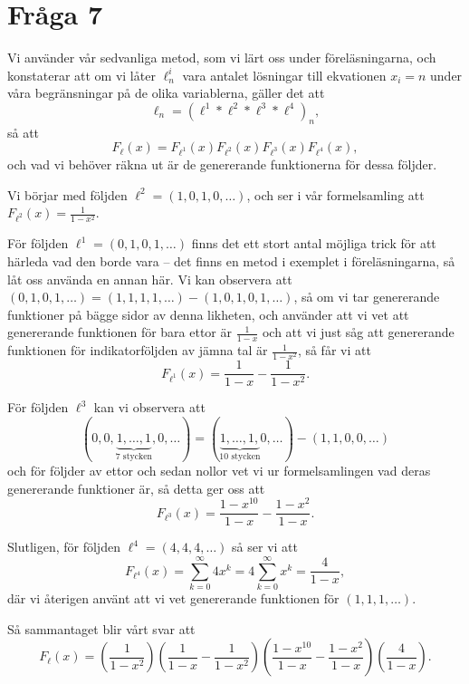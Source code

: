 \documentclass[nobib]{tufte-handout}
\begin{document}
\section{Fråga 7}

Vi använder vår sedvanliga metod, som vi lärt oss under föreläsningarna, och konstaterar att om vi låter $\ell^i_n$ vara antalet lösningar till ekvationen $x_i = n$ under våra begränsningar på de olika variablerna, gäller det att
$$\ell_n = (\ell^1 * \ell^2 * \ell^3 * \ell^4)_n,$$
så att
$$F_\ell(x) = F_{\ell^1}(x)F_{\ell^2}(x)F_{\ell^3}(x)F_{\ell^4}(x),$$
och vad vi behöver räkna ut är de genererande funktionerna för dessa följder.

Vi börjar med följden $\ell^2 = (1,0,1,0,\ldots)$, och ser i vår formelsamling att $F_{\ell^2}(x) = \frac{1}{1 - x^2}$.

För följden $\ell^1 = (0,1,0,1,\ldots)$ finns det ett stort antal möjliga trick för att härleda vad den borde vara -- det finns en metod i exemplet i föreläsningarna, så låt oss använda en annan här. Vi kan observera att $(0,1,0,1,\ldots) = (1,1,1,1,\ldots) - (1,0,1,0,1,\ldots)$, så om vi tar genererande funktioner på bägge sidor av denna likheten, och använder att vi vet att genererande funktionen för bara ettor är $\frac{1}{1-x}$ och att vi just såg att genererande funktionen för indikatorföljden av jämna tal är $\frac{1}{1 - x^2}$, så får vi att
$$F_{\ell^1}(x) = \frac{1}{1 - x} - \frac{1}{1 - x^2}.$$

För följden $\ell^3$ kan vi observera att
$$(0,0,\underbrace{1,\ldots,1}_{7\text{ stycken}},0,\ldots) = (\underbrace{1,\ldots,1,}_{10\text{ stycken}}0,\ldots) - (1,1,0,0,\ldots)$$
och för följder av ettor och sedan nollor vet vi ur formelsamlingen vad deras genererande funktioner är, så detta ger oss att
$$F_{\ell^3}(x) = \frac{1 - x^{10}}{1-x} - \frac{1 - x^2}{1 - x}.$$

Slutligen, för följden $\ell^4 = (4,4,4,\ldots)$ så ser vi att
$$F_{\ell^4}(x) = \sum_{k=0}^{\infty} 4 x^k = 4 \sum_{k=0}^{\infty} x^k = \frac{4}{1 - x},$$
där vi återigen använt att vi vet genererande funktionen för $(1,1,1,\ldots)$.

Så sammantaget blir vårt svar att
$$F_\ell(x) = \left(\frac{1}{1 - x^2}\right)\left(\frac{1}{1 - x} - \frac{1}{1 - x^2}\right)\left(\frac{1 - x^{10}}{1-x} - \frac{1 - x^2}{1 - x}\right)\left(\frac{4}{1 - x}\right).$$

%
%
\end{document}

